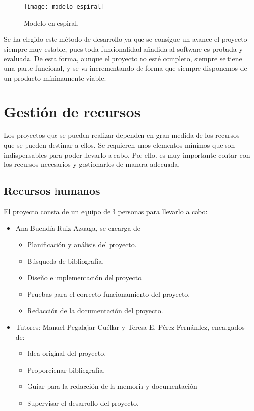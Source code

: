 \begin{figure}
\begin{center}
\caption{Modelo en espiral.}
\label{modelo_espiral}
\texttt{[image: modelo\_espiral]}
\end{center}
\end{figure}

Se ha elegido este método de desarrollo ya que se consigue un avance el proyecto siempre muy estable, pues toda funcionalidad añadida al software es probada y evaluada. De esta forma, aunque el proyecto no esté completo, siempre se tiene una parte funcional, y se va incrementando de forma que siempre disponemos de un producto mínimamente viable. 

\section{Gestión de recursos}

Los proyectos que se pueden realizar dependen en gran medida de los recursos que se pueden destinar a ellos. Se requieren unos elementos mínimos que son indispensables para poder llevarlo a cabo. Por ello, es muy importante contar con los recursos necesarios y gestionarlos de manera adecuada.

\subsection{Recursos humanos}

El proyecto consta de un equipo de 3 personas para llevarlo a cabo:

\begin{itemize}
\item Ana Buendía Ruiz-Azuaga, se encarga de:
	\begin{itemize}
	\item Planificación y análisis del proyecto.
	\item Búsqueda de bibliografía.
	\item Diseño e implementación del proyecto.
	\item Pruebas para el correcto funcionamiento del proyecto.
	\item Redacción de la documentación del proyecto.
	\end{itemize}
\item Tutores: Manuel Pegalajar Cuéllar y Teresa E. Pérez Fernández, encargados de:
	\begin{itemize}
	\item Idea original del proyecto.
	\item Proporcionar bibliografía.
	\item Guiar para la redacción de la memoria y documentación.
	\item Supervisar el desarrollo del proyecto.
	\end{itemize}
\end{itemize}

